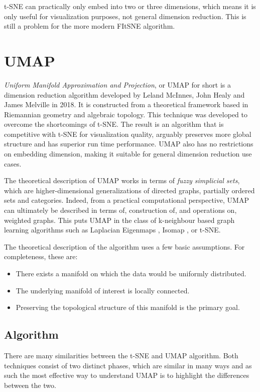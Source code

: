t-SNE can practically only embed into two or three dimensions, which means it is only useful for visualization purposes, not general dimension reduction. This is still a problem for the more modern FItSNE algorithm.

\section{UMAP}\label{sec:umap}

\textit{Uniform Manifold Approximation and Projection}\cite{bib:umap}, or UMAP for short is a dimension reduction algorithm developed by Leland McInnes, John Healy and James Melville in 2018. It is constructed from a theoretical framework based in Riemannian geometry and algebraic topology. This technique was developed to overcome the shortcomings of t-SNE. The result is an algorithm that is competitive with t-SNE for visualization quality, arguably preserves more global structure and has superior run time performance. UMAP also has no restrictions on embedding dimension, making it suitable for general dimension reduction use cases.

The theoretical description of UMAP works in terms of \textit{fuzzy simplicial sets}, which are higher-dimensional generalizations of directed graphs, partially ordered sets and categories. Indeed, from a practical computational perspective, UMAP can ultimately be described in terms of, construction of, and operations on, weighted graphs. This puts UMAP in the class of k-neighbour based graph learning algorithms such as Laplacian Eigenmaps \cite{bib:laplacian_eigenmaps}, Isomap \cite{bib:isomap}, or t-SNE.

The theoretical description of the algorithm uses a few basic assumptions. For completeness, these are:

\begin{itemize}
	\item There exists a manifold on which the data would be uniformly distributed.
	\item The underlying manifold of interest is locally connected.
	\item Preserving the topological structure of this manifold is the primary goal.
\end{itemize}

\subsection{Algorithm}

There are many similarities between the t-SNE and UMAP algorithm. Both techniques consist of two distinct phases, which are similar in many ways and as such the most effective way to understand UMAP is to highlight the differences between the two.

